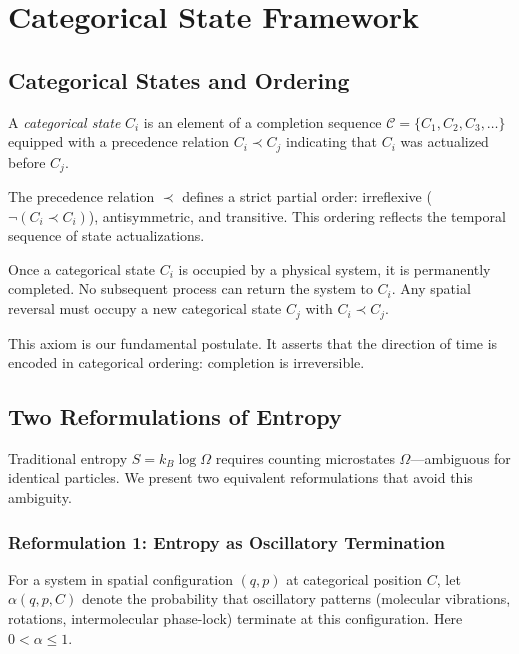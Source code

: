 \section{Categorical State Framework}

\subsection{Categorical States and Ordering}

\begin{definition}
A \emph{categorical state} $C_i$ is an element of a completion sequence $\mathcal{C} = \{C_1, C_2, C_3, \ldots\}$ equipped with a precedence relation $C_i \prec C_j$ indicating that $C_i$ was actualized before $C_j$.
\end{definition}

The precedence relation $\prec$ defines a strict partial order: irreflexive ($\neg(C_i \prec C_i)$), antisymmetric, and transitive. This ordering reflects the temporal sequence of state actualizations.

\begin{axiom}
\label{ax:irreversibility}
Once a categorical state $C_i$ is occupied by a physical system, it is permanently completed. No subsequent process can return the system to $C_i$. Any spatial reversal must occupy a new categorical state $C_j$ with $C_i \prec C_j$.
\end{axiom}

This axiom is our fundamental postulate. It asserts that the direction of time is encoded in categorical ordering: completion is irreversible.

\subsection{Two Reformulations of Entropy}

Traditional entropy $S = k_B \log \Omega$ requires counting microstates $\Omega$—ambiguous for identical particles. We present two equivalent reformulations that avoid this ambiguity.

\subsubsection{Reformulation 1: Entropy as Oscillatory Termination}

\begin{definition}
\label{def:alpha}
For a system in spatial configuration $(q,p)$ at categorical position $C$, let $\alpha(q,p,C)$ denote the probability that oscillatory patterns (molecular vibrations, rotations, intermolecular phase-lock) terminate at this configuration. Here $0 < \alpha \leq 1$.
\end{definition}


